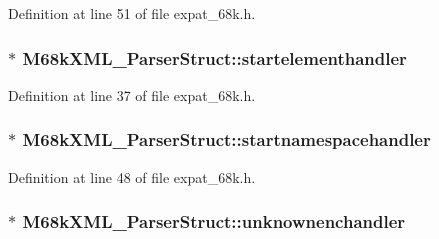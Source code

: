 Definition at line 51 of file expat\+\_\+68k.\+h.

\subsubsection[{\texorpdfstring{startelementhandler}{startelementhandler}}]{$\ast$ M68k\+X\+M\+L\+\_\+\+Parser\+Struct\+::startelementhandler}\hypertarget{struct_m68k_x_m_l___parser_struct_aaa1a6d24064b43ed8d6ee5d81e8c7531}{}\label{struct_m68k_x_m_l___parser_struct_aaa1a6d24064b43ed8d6ee5d81e8c7531}


Definition at line 37 of file expat\+\_\+68k.\+h.

\subsubsection[{\texorpdfstring{startnamespacehandler}{startnamespacehandler}}]{$\ast$ M68k\+X\+M\+L\+\_\+\+Parser\+Struct\+::startnamespacehandler}\hypertarget{struct_m68k_x_m_l___parser_struct_ab711d9b720620a41d34b104bbf66ebe1}{}\label{struct_m68k_x_m_l___parser_struct_ab711d9b720620a41d34b104bbf66ebe1}


Definition at line 48 of file expat\+\_\+68k.\+h.

\subsubsection[{\texorpdfstring{unknownenchandler}{unknownenchandler}}]{$\ast$ M68k\+X\+M\+L\+\_\+\+Parser\+Struct\+::unknownenchandler}\hypertarget{struct_m68k_x_m_l___parser_struct_a57453f6c83ba0d01036b9de0ff0e43a6}{}\label{struct_m68k_x_m_l___parser_struct_a57453f6c83ba0d01036b9de0ff0e43a6}


